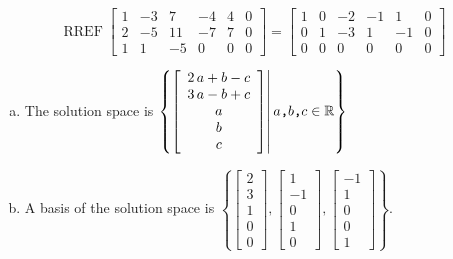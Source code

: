 \begin{exerciseAnswer} 


\[\operatorname{RREF} \left[\begin{array}{ccccc|c}
1 & -3 & 7 & -4 & 4 & 0 \\
2 & -5 & 11 & -7 & 7 & 0 \\
1 & 1 & -5 & 0 & 0 & 0
\end{array}\right] = \left[\begin{array}{ccccc|c}
1 & 0 & -2 & -1 & 1 & 0 \\
0 & 1 & -3 & 1 & -1 & 0 \\
0 & 0 & 0 & 0 & 0 & 0
\end{array}\right] \]


\begin{enumerate}[(a)]
\item The solution space is \( \left\{ \left[\begin{array}{c}
2 \, a + b - c \\
3 \, a - b + c \\
a \\
b \\
c
\end{array}\right] \middle|\,a\text{\texttt{,}}b\text{\texttt{,}}c\in\mathbb{R}\right\} \)
\item A basis of the solution space is \( \left\{ \left[\begin{array}{c}
2 \\
3 \\
1 \\
0 \\
0
\end{array}\right] , \left[\begin{array}{c}
1 \\
-1 \\
0 \\
1 \\
0
\end{array}\right] , \left[\begin{array}{c}
-1 \\
1 \\
0 \\
0 \\
1
\end{array}\right] \right\} \).
\end{enumerate}
    
\end{exerciseAnswer}
    

